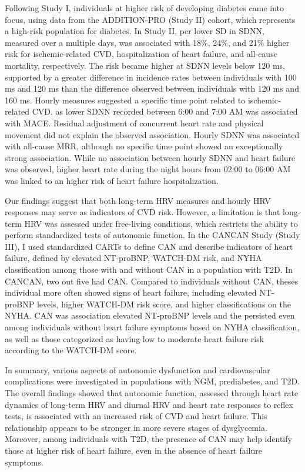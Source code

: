 \documentclass[
  a4paper,
  headsepline=true,
  open=any]{scrbook}
\begin{document}
Following Study I, individuals at higher risk of developing diabetes
came into focus, using data from the ADDITION-PRO (Study II) cohort,
which represents a high-risk population for diabetes. In Study II, per
lower SD in SDNN, measured over a multiple days, was associated with
18\%, 24\%, and 21\% higher risk for ischemic-related CVD,
hospitalization of heart failure, and all-cause mortality, respectively.
The risk became higher at SDNN levels below 120 ms, supported by a
greater difference in incidence rates between individuals with 100 ms
and 120 ms than the difference observed between individuals with 120 ms
and 160 ms. Hourly measures suggested a specific time point related to
ischemic-related CVD, as lower SDNN recorded between 6:00 and 7:00 AM
was associated with MACE. Residual adjustment of concurrent heart rate
and physical movement did not explain the observed association. Hourly
SDNN was associated with all-cause MRR, although no specific time point
showed an exceptionally strong association. While no association between
hourly SDNN and heart failure was observed, higher heart rate during the
night hours from 02:00 to 06:00 AM was linked to an higher risk of heart
failure hospitalization.

Our findings suggest that both long-term HRV measures and hourly HRV
responses may serve as indicators of CVD risk. However, a limitation is
that long-term HRV was assessed under free-living conditions, which
restricts the ability to perform standardized tests of autonomic
function. In the CANCAN Study (Study III), I used standardized CARTs to
define CAN and describe indicators of heart failure, defined by elevated
NT-proBNP, WATCH-DM risk, and NYHA classification among those with and
without CAN in a population with T2D. In CANCAN, two out five had CAN.
Compared to individuals without CAN, theses individual more often showed
signs of heart failure, including elevated NT-proBNP levels, higher
WATCH-DM risk score, and higher classifications on the NYHA. CAN was
association elevated NT-proBNP levels and the persisted even among
individuals without heart failure symptoms based on NYHA classification,
as well as those categorized as having low to moderate heart failure
risk according to the WATCH-DM score.

In summary, various aspects of autonomic dysfunction and cardiovascular
complications were investigated in populations with NGM, prediabetes,
and T2D. The overall findings showed that autonomic function, assessed
through heart rate dynamics of long-term HRV and diurnal HRV and heart
rate responses to reflex tests, is associated with an increased risk of
CVD and heart failure. This relationship appears to be stronger in more
severe stages of dysglycemia. Moreover, among individuals with T2D, the
presence of CAN may help identify those at higher risk of heart failure,
even in the absence of heart failure symptoms.
\end{document}
